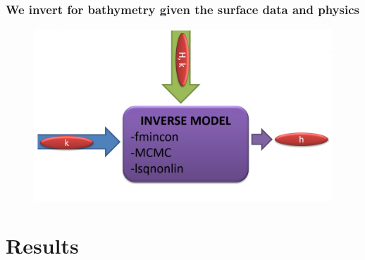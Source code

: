\documentclass[7pt]{beamer}
\begin{document}
\begin{frame}
 \frametitle{We invert for bathymetry given the surface data and physics}

\begin{figure}[flowchart]
\includegraphics[width=1.0\linewidth]{img/INV.png}\hfill
\end{figure}






\end{frame}
\section{Results}

\end{document}
